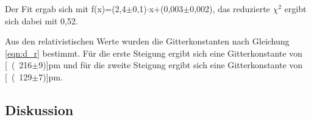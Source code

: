 \documentclass[12pt,a4paper]{article}
\begin{document}
Der Fit ergab sich mit f(x)=(2,4$\pm$0,1)$\cdot$x+(0,003$\pm$0,002), das reduzierte $\chi^2$ ergibt sich dabei mit 0,52.

Aus den relativistischen Werte wurden die Gitterkonstanten nach Gleichung \ref{eqn:d_r} bestimmt. Für die erste Steigung ergibt sich eine Gitterkonstante von \unit[(216$\pm$9)]{pm} und für die zweite Steigung ergibt sich eine Gitterkonstante von \unit[(129$\pm$7)]{pm}.
\newpage
\subsection{Diskussion}
\end{document}
